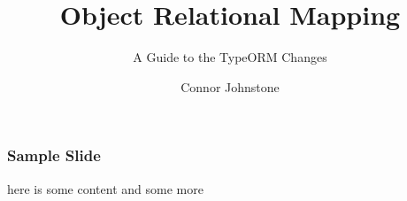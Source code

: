 \documentclass{beamer}
\title[]{Object Relational Mapping}
\subtitle[]{A Guide to the TypeORM Changes}
\author[]{Connor Johnstone}
\institute[]{Palski and Associates}
\date{}
\begin{document}
  \begin{frame}
  \titlepage
  \end{frame}

  \begin{frame}[fragile]
  \frametitle{Sample Slide}
  here is some content
  and some more
  \end{frame}
\end{document}
